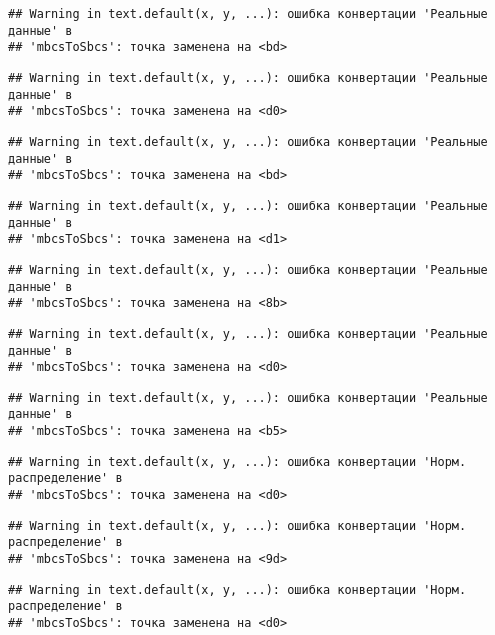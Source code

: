 \documentclass[
]{article}
\begin{document}
\begin{verbatim}
## Warning in text.default(x, y, ...): ошибка конвертации 'Реальные данные' в
## 'mbcsToSbcs': точка заменена на <bd>
\end{verbatim}

\begin{verbatim}
## Warning in text.default(x, y, ...): ошибка конвертации 'Реальные данные' в
## 'mbcsToSbcs': точка заменена на <d0>
\end{verbatim}

\begin{verbatim}
## Warning in text.default(x, y, ...): ошибка конвертации 'Реальные данные' в
## 'mbcsToSbcs': точка заменена на <bd>
\end{verbatim}

\begin{verbatim}
## Warning in text.default(x, y, ...): ошибка конвертации 'Реальные данные' в
## 'mbcsToSbcs': точка заменена на <d1>
\end{verbatim}

\begin{verbatim}
## Warning in text.default(x, y, ...): ошибка конвертации 'Реальные данные' в
## 'mbcsToSbcs': точка заменена на <8b>
\end{verbatim}

\begin{verbatim}
## Warning in text.default(x, y, ...): ошибка конвертации 'Реальные данные' в
## 'mbcsToSbcs': точка заменена на <d0>
\end{verbatim}

\begin{verbatim}
## Warning in text.default(x, y, ...): ошибка конвертации 'Реальные данные' в
## 'mbcsToSbcs': точка заменена на <b5>
\end{verbatim}

\begin{verbatim}
## Warning in text.default(x, y, ...): ошибка конвертации 'Норм. распределение' в
## 'mbcsToSbcs': точка заменена на <d0>
\end{verbatim}

\begin{verbatim}
## Warning in text.default(x, y, ...): ошибка конвертации 'Норм. распределение' в
## 'mbcsToSbcs': точка заменена на <9d>
\end{verbatim}

\begin{verbatim}
## Warning in text.default(x, y, ...): ошибка конвертации 'Норм. распределение' в
## 'mbcsToSbcs': точка заменена на <d0>
\end{verbatim}
\end{document}
